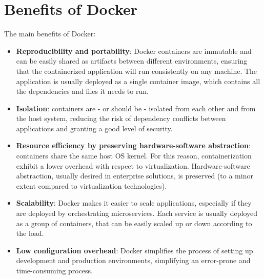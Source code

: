 \section{Benefits of Docker}
The main benefits of Docker:
\begin{itemize}
    \item \textbf{Reproducibility and portability}: Docker containers are immutable and can be easily shared as artifacts between different environments, ensuring that the containerized application will run consistently on any machine. The application is usually deployed as a single container image, which contains all the dependencies and files it needs to run. 
    \item \textbf{Isolation}: containers are - or should be - isolated from each other and from the host system, reducing the risk of dependency conflicts between applications and granting a good level of security.
    \item \textbf{Resource efficiency by preserving hardware-software abstraction}: containers share the same host OS kernel. For this reason, containerization exhibit a lower overhead with respect to virtualization. Hardware-software abstraction, usually desired in enterprise solutions, is preserved (to a minor extent compared to virtualization technologies).
    \item \textbf{Scalability}: Docker makes it easier to scale applications, especially if they are deployed by orchestrating microservices. Each service is usually deployed as a group of containers, that can be easily scaled up or down according to the load. 
    \item \textbf{Low configuration overhead}: Docker simplifies the process of setting up development and production environments, simplifying an error-prone and time-consuming process.
\end{itemize}












